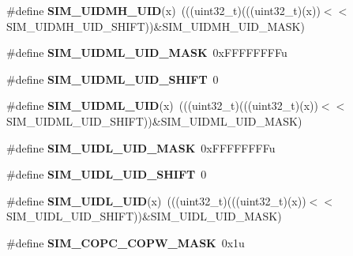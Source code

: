 \begin{DoxyCompactItemize}
\#define {\bfseries S\+I\+M\+\_\+\+U\+I\+D\+M\+H\+\_\+\+U\+ID}(x)~(((uint32\+\_\+t)(((uint32\+\_\+t)(x))$<$$<$S\+I\+M\+\_\+\+U\+I\+D\+M\+H\+\_\+\+U\+I\+D\+\_\+\+S\+H\+I\+FT))\&S\+I\+M\+\_\+\+U\+I\+D\+M\+H\+\_\+\+U\+I\+D\+\_\+\+M\+A\+SK)
\item 
\mbox{\label{group___s_i_m___register___masks_ga87fba538d2482490ddfdb1ef8a44ec66}} 
\#define {\bfseries S\+I\+M\+\_\+\+U\+I\+D\+M\+L\+\_\+\+U\+I\+D\+\_\+\+M\+A\+SK}~0x\+F\+F\+F\+F\+F\+F\+F\+Fu
\item 
\mbox{\label{group___s_i_m___register___masks_gacedaca5a049852ee395767e70f806c14}} 
\#define {\bfseries S\+I\+M\+\_\+\+U\+I\+D\+M\+L\+\_\+\+U\+I\+D\+\_\+\+S\+H\+I\+FT}~0
\item 
\mbox{\label{group___s_i_m___register___masks_ga0eb63e00b9ee42283435043b437b8d29}} 
\#define {\bfseries S\+I\+M\+\_\+\+U\+I\+D\+M\+L\+\_\+\+U\+ID}(x)~(((uint32\+\_\+t)(((uint32\+\_\+t)(x))$<$$<$S\+I\+M\+\_\+\+U\+I\+D\+M\+L\+\_\+\+U\+I\+D\+\_\+\+S\+H\+I\+FT))\&S\+I\+M\+\_\+\+U\+I\+D\+M\+L\+\_\+\+U\+I\+D\+\_\+\+M\+A\+SK)
\item 
\mbox{\label{group___s_i_m___register___masks_ga412340eabbcd0f0d48ce4886e9beb071}} 
\#define {\bfseries S\+I\+M\+\_\+\+U\+I\+D\+L\+\_\+\+U\+I\+D\+\_\+\+M\+A\+SK}~0x\+F\+F\+F\+F\+F\+F\+F\+Fu
\item 
\mbox{\label{group___s_i_m___register___masks_ga6fb1383717ebfa6f47b5a5952fd21d63}} 
\#define {\bfseries S\+I\+M\+\_\+\+U\+I\+D\+L\+\_\+\+U\+I\+D\+\_\+\+S\+H\+I\+FT}~0
\item 
\mbox{\label{group___s_i_m___register___masks_ga636c37811a4a8c9a57df79fd1790b800}} 
\#define {\bfseries S\+I\+M\+\_\+\+U\+I\+D\+L\+\_\+\+U\+ID}(x)~(((uint32\+\_\+t)(((uint32\+\_\+t)(x))$<$$<$S\+I\+M\+\_\+\+U\+I\+D\+L\+\_\+\+U\+I\+D\+\_\+\+S\+H\+I\+FT))\&S\+I\+M\+\_\+\+U\+I\+D\+L\+\_\+\+U\+I\+D\+\_\+\+M\+A\+SK)
\item 
\mbox{\label{group___s_i_m___register___masks_gabea5c1af6c493fe6e417dd6c3eba4ad6}} 
\#define {\bfseries S\+I\+M\+\_\+\+C\+O\+P\+C\+\_\+\+C\+O\+P\+W\+\_\+\+M\+A\+SK}~0x1u
$$
\end{DoxyCompactItemize}
